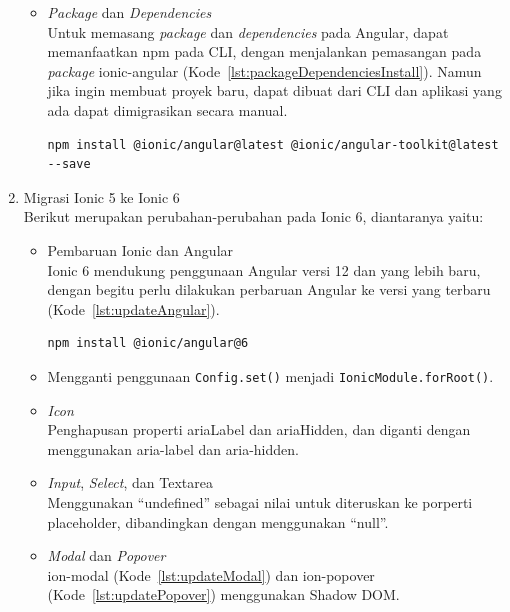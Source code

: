 \begin{enumerate}
\begin{itemize}
		\item {\it Package} dan {\it Dependencies} \\
		Untuk memasang {\it package} dan {\it dependencies} pada Angular, dapat memanfaatkan npm pada CLI, dengan menjalankan pemasangan pada {\it package} ionic-angular  (Kode~\ref{lst:packageDependenciesInstall}). Namun jika ingin membuat proyek baru, dapat dibuat dari CLI dan aplikasi yang ada dapat dimigrasikan secara manual.
\begin{lstlisting}[label={lst:packageDependenciesInstall}, caption=Kode untuk Memasang {\it Package} dan {\it Dependencies} pada Angular]
npm install @ionic/angular@latest @ionic/angular-toolkit@latest --save
\end{lstlisting} 
	\end{itemize}
	\item Migrasi Ionic 5 ke Ionic 6 \\
	Berikut merupakan perubahan-perubahan pada Ionic 6, diantaranya yaitu:
	\begin{itemize}
		\item Pembaruan Ionic dan Angular \\
		Ionic 6 mendukung penggunaan Angular versi 12 dan yang lebih baru, dengan begitu perlu dilakukan perbaruan Angular ke versi yang terbaru (Kode~\ref{lst:updateAngular}).
		
\begin{lstlisting}[label={lst:updateAngular}, caption=Kode untuk Memperbarui Versi Ionic 6 dengan versi Angular Terbaru]
npm install @ionic/angular@6
\end{lstlisting} 

		\item Mengganti penggunaan \texttt{Config.set()} menjadi \texttt{IonicModule.forRoot()}.

		\item \textit{Icon} \\
		Penghapusan properti ariaLabel dan ariaHidden, dan diganti dengan menggunakan aria-label dan aria-hidden.
		\item \textit{Input}, \textit{Select}, dan Textarea \\
		Menggunakan ``undefined'' sebagai nilai untuk diteruskan ke porperti placeholder, dibandingkan dengan menggunakan ``null''.	
		
		\item \textit{Modal} dan \textit{Popover} \\
		ion-modal (Kode~\ref{lst:updateModal}) dan ion-popover (Kode~\ref{lst:updatePopover}) menggunakan Shadow DOM.
		

\end{itemize}
\end{enumerate}
